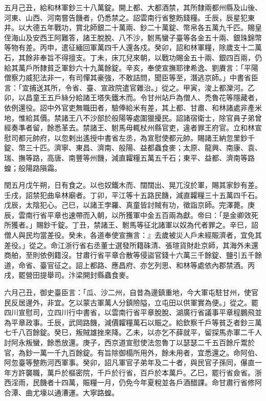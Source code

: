 \begin{pinyinscope}
 五月己丑，給和林軍鈔三十八萬錠。開上都、大都酒禁，其所隸兩都州縣及山後、河東、山西、河南嘗告饑者，仍悉禁之。詔雲南行省整飭錢糧。壬辰，辰星犯東井。以大德五年戰功，賞北師銀二十萬兩、鈔二十萬錠、幣帛各五萬九千匹。賜皇侄海山及安西王阿難答，諸王脫脫、八不沙，駙馬蠻子臺等各金五十兩、銀珠錦幣等物有差。丙申，遣征緬回軍萬四千人還各戍。癸卯，詔和林軍糧，除歲支十二萬石，其餘非奉旨不得擅支。丁未，床兀兒來朝，以戰功賜金五十兩、銀四百兩，仍給其萬戶所隸貧乏軍鈔六十九萬餘錠。辛亥，奉使宣撫耶律希逸、劉賡言：「平陽僧察力威犯法非一，有司憚其豪強，不敢詰問，聞臣等至，潛逃京師。」中書省臣言：「宜捕送其所，令省、臺、宣政院遣官雜治。」從之。甲寅，浚上都灤河。乙卯，以昌童王五戶絲分給諸王塔失鐵木而。令甘州站戶為僧人、禿魯花等隱藏者，依例還役。詔中外官吏無職田者，驗俸給米有差，其上都、甘肅、和林諸處非產米地，惟給其價。禁諸王八不沙部於般陽等處圍獵擾民。詔諸宿衛士，除官員子弟曾經奏準者留，餘悉革去。禁諸王、駙馬毋輒杖州縣官吏，違者罪王府官。立和林宣慰司都元帥府，以忽剌出遙授中書省左丞，為宣慰使都元帥。賜諸王納忽里鈔千錠、幣三十匹。濟寧、東昌、濟南、般陽、益都蟲食麥；太原、龍興、南康、袁、瑞、撫等路，高唐、南豐等州饑，減直糶糧五萬五千石；東平、益都、濟南等路蝗；般陽路隕霜。



 閏五月戊午朔，日有食之。以也奴鐵木而、闊闊出、晃兀沒於軍，賜其家鈔有差。壬戌，詔禁犯曲阜林廟者。丁卯，平江等十五路民饑，減直糶糧三十五萬四千石。戊辰，太陰犯心。己巳，以諸王孛羅、真童皆討賊有功，徵詣京師。完澤薨。庚辰，雲南行省平章也速帶而入朝，以所獲軍中金五百兩為獻。帝曰：「是金卿效死所獲者。」賜鈔千錠。丁丑，禁諸王、駙馬等征北諸軍以奴為代者罪之。辛巳，詔僧人與民均當差役。癸未，各道奉使宣撫言：』去歲被災人戶未經賑濟者，宜免其差役。」從之。命江浙行省右丞董士選發所籍硃清、張瑄貨財赴京師，其海外未還商舶，至則依例籍沒。甘肅行省平章合散等侵盜官錢十六萬三千餘錠、鹽引五千餘道，命省、臺官征之。詔上都路、應昌府、亦乞列思、和林等處依內郡禁酒。丙戌，罷營田提舉司。汴梁開封縣蟲食麥。



 六月己丑，御史臺臣言：「瓜、沙二州，自昔為邊鎮重地，今大軍屯駐甘州，使官民反居邊外，非宜。乞以蒙古軍萬人分鎮險隘，立屯田以供軍實為便。」從之。罷四川宣慰司，立四川行中書省，以雲南行省平章脫脫、湖廣行省議事平章程鵬飛並為平章政事。壬辰，武岡路饑，減價糶糧萬石以賑之。給欽察千戶等貧乏者鈔三萬七千八百餘錠。癸巳，叛賊雄挫來降。乙未，以亦乞不薛就平，留探馬赤軍二千人討阿永叛蠻，餘悉放還。庚子，西京道宣慰使法忽魯丁以瑟瑟二千五百餘斤鬻於官，為鈔一萬一千九百餘錠。有旨除御榻所用外，餘未用者，宜悉還之。命阿伯、阿忽臺等整飭河西軍事。癸卯，詔凡軍官子弟年及二十者，與民官子孫同，儤直一年方許襲職，萬戶於樞密院，千戶於行省，百戶於本萬戶。乙巳，罷行省僉省。浙西淫雨，民饑者十四萬，賑糧一月，仍免今年夏稅並各戶酒醋課。命甘肅行省修阿合潭、曲尤壕以通漕運。大寧路蝗。




\end{pinyinscope}
